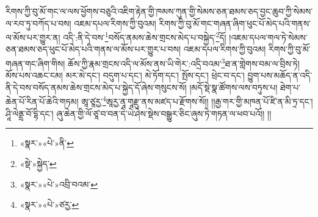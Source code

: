 རིགས་ཀྱི་བུ་མོ་གང་ལ་ལས་ཕྱོགས་བཅུའི་འཇིག་རྟེན་གྱི་ཁམས་ཀུན་གྱི་སེམས་ཅན་ཐམས་ཅད་བྱང་ཆུབ་ཀྱི་སེམས་ལ་རབ་ཏུ་བཀོད་པ་བས། འཇམ་དཔལ་རིགས་ཀྱི་བུའམ། རིགས་ཀྱི་བུ་མོ་གང་གཞན་ཞིག་ཕུང་པོ་མེད་པའི་གནས་ལ་མོས་པར་གྱུར་ན། འདི་:ནི་དེ་བས་\footnote{«སྣར་»«པེ་»ནི་}བསོད་ནམས་ཆེས་གྲངས་མེད་པ་བསྐྱེད་\footnote{«སྡེ་»སྐྱེད་}དོ། །འཇམ་དཔལ་གལ་ཏེ་སེམས་ཅན་ཐམས་ཅད་ཕུང་པོ་མེད་པའི་གནས་ལ་མོས་པར་གྱུར་པ་བས། འཇམ་དཔལ་རིགས་ཀྱི་བུའམ། རིགས་ཀྱི་བུ་མོ་གཞན་གང་ཞིག་གིས། ཆོས་ཀྱི་རྣམ་གྲངས་འདི་ལ་མོས་ནས་ཡི་གེར་:འདྲི་བའམ་\footnote{«སྣར་»«པེ་»འབྲི་བའམ་}ཐ་ན་གླེགས་བམ་ལ་བྲིས་ཏེ། མོས་པས་འཆང་ངམ། མར་མེ་དང་། བདུག་པ་དང་། མེ་ཏོག་དང་། སྤོས་དང་། ཕྲེང་བ་དང་། བྱུག་པས་མཆོད་ན་འདི་ནི་དེ་བས་བསོད་ནམས་ཆེས་གྲངས་མེད་པ་སྐྱེད་དོ་ཞེས་གསུངས་སོ། །མདོ་སྡེ་སྣ་ཚོགས་ལས་བཏུས་པ། ཐེག་པ་ཆེན་པོ་རིན་པོ་ཆེའི་གཏམ། ཨཱ་ཙཱརྱ་\footnote{«སྣར་»«པེ་»ཙརྱ་}ཨཱརྱ་ནཱ་གཱརྫུ་ནས་མཛད་པ་རྫོགས་སོ།། །།རྒྱ་གར་གྱི་མཁན་པོ་ཛི་ན་མི་ཏྲ་དང་། ཤཱི་ལེནྡྲ་བོ་དྷི་དང་། ཞུ་ཆེན་གྱི་ལོ་ཙཱ་བ་བན་དེ་ཡེ་ཤེས་སྡེས་བསྒྱུར་ཅིང་ཞུས་ཏེ་གཏན་ལ་ཕབ་པའོ།། །།